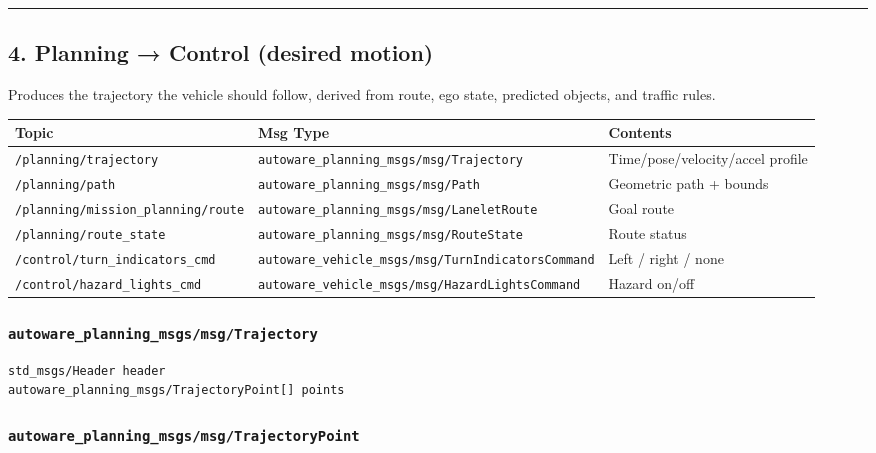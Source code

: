 \documentclass[
]{article}
\begin{document}
\begin{center}\rule{0.5\linewidth}{0.5pt}\end{center}

\subsection{4. Planning → Control (desired
motion)}\label{4-planning--control-desired-motion}

Produces the trajectory the vehicle should follow, derived from route,
ego state, predicted objects, and traffic rules.

\begin{longtable}[]{@{}lll@{}}
\toprule\noalign{}
Topic & Msg Type & Contents \\
\midrule\noalign{}
\endhead
\bottomrule\noalign{}
\endlastfoot
\texttt{/planning/trajectory} &
\texttt{autoware\_planning\_msgs/msg/Trajectory} &
Time/pose/velocity/accel profile \\
\texttt{/planning/path} & \texttt{autoware\_planning\_msgs/msg/Path} &
Geometric path + bounds \\
\texttt{/planning/mission\_planning/route} &
\texttt{autoware\_planning\_msgs/msg/LaneletRoute} & Goal route \\
\texttt{/planning/route\_state} &
\texttt{autoware\_planning\_msgs/msg/RouteState} & Route status \\
\texttt{/control/turn\_indicators\_cmd} &
\texttt{autoware\_vehicle\_msgs/msg/TurnIndicatorsCommand} & Left /
right / none \\
\texttt{/control/hazard\_lights\_cmd} &
\texttt{autoware\_vehicle\_msgs/msg/HazardLightsCommand} & Hazard
on/off \\
\end{longtable}

\subsubsection{\texorpdfstring{\texttt{autoware\_planning\_msgs/msg/Trajectory}}{autoware\_planning\_msgs/msg/Trajectory}}\label{autoware_planning_msgsmsgtrajectory}

\begin{verbatim}
std_msgs/Header header
autoware_planning_msgs/TrajectoryPoint[] points
\end{verbatim}

\subsubsection{\texorpdfstring{\texttt{autoware\_planning\_msgs/msg/TrajectoryPoint}}{autoware\_planning\_msgs/msg/TrajectoryPoint}}\label{autoware_planning_msgsmsgtrajectorypoint}
\end{document}

